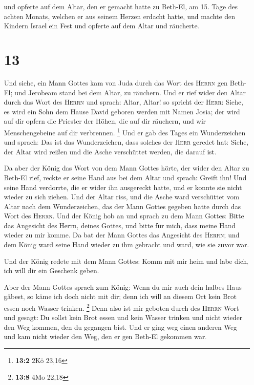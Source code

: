  und opferte auf dem Altar, den er gemacht hatte zu
Beth-El, am 15. Tage des achten Monats, welchen er aus seinem Herzen
erdacht hatte, und machte den Kindern Israel ein Fest und opferte auf
dem Altar und räucherte.

\hypertarget{section-12}{%
\section{13}\label{section-12}}

 Und siehe, ein Mann Gottes kam von Juda durch das Wort
des \textsc{Herrn} gen Beth-El; und Jerobeam stand bei dem Altar, zu
räuchern.  Und er rief wider den Altar durch das Wort des
\textsc{Herrn} und sprach: Altar, Altar! so spricht der \textsc{Herr}:
Siehe, es wird ein Sohn dem Hause David geboren werden mit Namen Josia;
der wird auf dir opfern die Priester der Höhen, die auf dir räuchern,
und wir Menschengebeine auf dir verbrennen. \footnote{\textbf{13:2} 2Kö
  23,16}  Und er gab des Tages ein Wunderzeichen und
sprach: Das ist das Wunderzeichen, dass solches der \textsc{Herr}
geredet hat: Siehe, der Altar wird reißen und die Asche verschüttet
werden, die darauf ist.

 Da aber der König das Wort von dem Mann Gottes hörte, der
wider den Altar zu Beth-El rief, reckte er seine Hand aus bei dem Altar
und sprach: Greift ihn! Und seine Hand verdorrte, die er wider ihn
ausgereckt hatte, und er konnte sie nicht wieder zu sich ziehen.
 Und der Altar riss, und die Asche ward verschüttet vom
Altar nach dem Wunderzeichen, das der Mann Gottes gegeben hatte durch
das Wort des \textsc{Herrn}.  Und der König hob an und
sprach zu dem Mann Gottes: Bitte das Angesicht des Herrn, deines Gottes,
und bitte für mich, dass meine Hand wieder zu mir komme. Da bat der Mann
Gottes das Angesicht des \textsc{Herrn}; und dem König ward seine Hand
wieder zu ihm gebracht und ward, wie sie zuvor war.

 Und der König redete mit dem Mann Gottes: Komm mit mir
heim und labe dich, ich will dir ein Geschenk geben.

 Aber der Mann Gottes sprach zum König: Wenn du mir auch
dein halbes Haus gäbest, so käme ich doch nicht mit dir; denn ich will
an diesem Ort kein Brot essen noch Wasser trinken. \footnote{\textbf{13:8}
  4Mo 22,18}  Denn also ist mir geboten durch des
\textsc{Herrn} Wort und gesagt: Du sollst kein Brot essen und kein
Wasser trinken und nicht wieder den Weg kommen, den du gegangen bist.
 Und er ging weg einen anderen Weg und kam nicht wieder
den Weg, den er gen Beth-El gekommen war.

